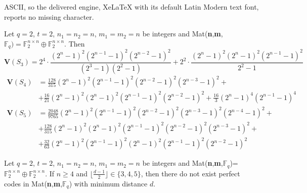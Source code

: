 \documentclass[10pt,a4paper]{amsart}
\begin{document}
ASCII, so the delivered engine, XeLaTeX with its default Latin Modern text font, reports no missing character.
\begin{proposition}
Let $q=2$, $t=2$, $n_1=n_2=n$, $m_1=m_2=n$ be integers and Mat(\textbf{n},\textbf{m},$\mathbb{F}_q)=\mathbb{F}_2^{n\times n}\oplus \mathbb{F}_2^{n\times n}$. Then
\begin{equation}\label{S_3}
\textbf{V}(S_3)=2^4\cdot\frac{(2^n-1)^2(2^{n-1}-1)^2(2^{n-2}-1)^2}{(2^3-1)(2^2-1)}+2^2\cdot\frac{(2^n-1)^2(2^n-1)^2(2^{n-1}-1)^2}{2^2-1}
\end{equation}
\begin{equation}\label{S_4}
	\begin{aligned}
\textbf{V}(S_4)&=\frac{128}{315}(2^n-1)^2(2^{n-1}-1)^2(2^{n-2}-1)^2(2^{n-3}-1)^2+\\&+\frac{16}{21}(2^n-1)^2(2^n-1)^2(2^{n-1}-1)^2(2^{n-2}-1)^2+\frac{16}{3}(2^n-1)^4(2^{n-1}-1)^4
\end{aligned}
\end{equation}
\begin{equation}\label{S_5}
\begin{aligned}
\textbf{V}(S_5)&=\frac{2048}{9765}(2^n-1)^2(2^{n-1}-1)^2(2^{n-2}-1)^2(2^{n-3}-1)^2(2^{n-4}-1)^2+\\&+\frac{128}{315}(2^n-1)^2(2^n-1)^2(2^{n-1}-1)^2(2^{n-2}-1)^2(2^{n-3}-1)^2+\\&+\frac{32}{63}(2^n-1)^2(2^{n-1}-1)^2(2^n-1)^2(2^{n-1}-1)^2(2^{n-2}-1)^2
\end{aligned}
\end{equation}
\end{proposition}

\begin{theorem}
Let $q=2$, $t=2$, $n_1=n_2=n$, $m_1=m_2=n$ be integers and Mat(\textbf{n},\textbf{m},$\mathbb{F}_q$)=$\mathbb{F}_2^{n\times n}\oplus\mathbb{F}_2^{n\times n}$. If $n \geq 4$ and $\lfloor\frac{d-1}{2}\rfloor\in\{3,4,5\}$, then there do not exist perfect codes in Mat(\textbf{n},\textbf{m},$\mathbb{F}_q$) with minimum distance $d$.
\end{theorem}
\end{document}
